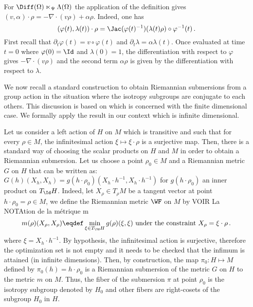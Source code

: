 \begin{example}\label{InfSemi}
For $\Diff(\Omega) \ltimes_\Psi \Lambda(\Omega)$ the application of the definition gives $(v,\alpha) \cdot \rho = -\nabla \cdot (v\rho) + \alpha \rho$. Indeed, one has
$$ (\varphi(t), \lambda(t)) \cdot \rho = \Jac(\varphi(t)^{-1}) (\lambda(t)\rho) \circ \varphi^{-1}(t)\,. $$
First recall that $\partial_t \varphi(t) = v \circ \varphi(t)$ and $\partial_t \lambda =\alpha \lambda(t)$.
Once evaluated at time $t=0$ where $\varphi(0) = \Id$ and $\lambda(0) = 1$, the differentiation with respect to $\varphi$ gives $-\nabla \cdot (v\rho)$ and the second term $\alpha \rho$ is given by the differentiation with respect to $\lambda$. 
\end{example}

We now recall a standard construction to obtain Riemannian submersions from a group action in the situation where the isotropy subgroups are conjugate to each others. This discussion is based on \cite[Section 29.21]{Michor2008b} which is concerned with the finite dimensional case. We formally apply the result in our context which is infinite dimensional.

Let us consider a left action of $H$ on $M$ which is transitive and such that for every $\rho \in M$, the infinitesimal action $\xi \mapsto \xi \cdot \rho$ is a surjective map. Then,
there is a standard way of choosing the scalar products on $H$ and $M$ in order to obtain a Riemannian submersion. Let us choose a point $\rho_0  \in M$ and a Riemannian metric $G$ on $H$ that can be written as: $G(h)(X_h,X_h) =  g(h\cdot \rho_0)(X_h \cdot h^{-1},X_h \cdot h^{-1})$ for $ g(h\cdot \rho_0)$ an inner product on $T_{\Id}H$. 
Indeed,
let $X_\rho \in T_\rho M$ be a tangent vector at point $h\cdot \rho_0 = \rho \in M$, we define the Riemannian metric $\WF$ on $M$ by
VOIR La NOTAtion de la métrique m
\begin{equation}\label{HLift}
m(\rho)(X_\rho,X_\rho) \eqdef \min_{\xi \in T_{\Id} H} g(\rho)(\xi,\xi) \text{ under the constraint } X_\rho = \xi \cdot \rho \,.
\end{equation}
where $\xi = X_h \cdot h^{-1}$. By hypothesis, the infinitesimal action is surjective, therefore the optimization set is not empty and it needs to be checked that the infimum is attained (in infinite dimensions). Then, by construction, the map $\pi_0: H \mapsto M$ defined by $\pi_0(h) = h\cdot \rho_0$ is a Riemannian submersion of the metric $G$ on $H$ to the metric $m$ on $M$.
Thus, the fiber of the submersion $\pi$ at point $\rho_0$ is the isotropy subgroup denoted by $H_0$ and other fibers are right-cosets of the subgroup $H_0$ in $H$.






